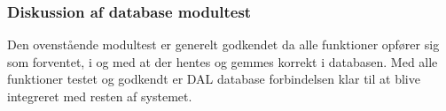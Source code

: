 \subsubsection{Diskussion af database modultest}

Den ovenstående modultest er generelt godkendet da alle funktioner opfører sig som forventet, i og med at der hentes og gemmes korrekt i databasen. Med alle funktioner testet og godkendt er DAL database forbindelsen klar til at blive integreret med resten af systemet.
